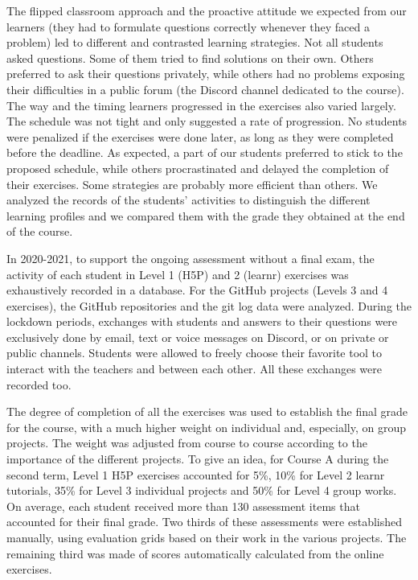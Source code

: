 \documentclass{aims}
\theoremstyle{definition}
\begin{document}
The flipped classroom approach and the proactive attitude we expected
from our learners (they had to formulate questions correctly whenever
they faced a problem) led to different and contrasted learning
strategies. Not all students asked questions. Some of them tried to find
solutions on their own. Others preferred to ask their questions
privately, while others had no problems exposing their difficulties in a
public forum (the Discord channel dedicated to the course). The way and
the timing learners progressed in the exercises also varied largely. The
schedule was not tight and only suggested a rate of progression. No
students were penalized if the exercises were done later, as long as
they were completed before the deadline. As expected, a part of our
students preferred to stick to the proposed schedule, while others
procrastinated and delayed the completion of their exercises. Some
strategies are probably more efficient than others. We analyzed the
records of the students' activities to distinguish the different
learning profiles and we compared them with the grade they obtained at
the end of the course.

In 2020-2021, to support the ongoing assessment without a final exam,
the activity of each student in Level 1 (H5P) and 2 (learnr) exercises
was exhaustively recorded in a database. For the GitHub projects (Levels
3 and 4 exercises), the GitHub repositories and the git log data were
analyzed. During the lockdown periods, exchanges with students and
answers to their questions were exclusively done by email, text or voice
messages on Discord, or on private or public channels. Students were
allowed to freely choose their favorite tool to interact with the
teachers and between each other. All these exchanges were recorded too.

The degree of completion of all the exercises was used to establish the
final grade for the course, with a much higher weight on individual and,
especially, on group projects. The weight was adjusted from course to
course according to the importance of the different projects. To give an
idea, for Course A during the second term, Level 1 H5P exercises
accounted for 5\%, 10\% for Level 2 learnr tutorials, 35\% for Level 3
individual projects and 50\% for Level 4 group works. On average, each
student received more than 130 assessment items that accounted for their
final grade. Two thirds of these assessments were established manually,
using evaluation grids based on their work in the various projects. The
remaining third was made of scores automatically calculated from the
online exercises.
\end{document}
